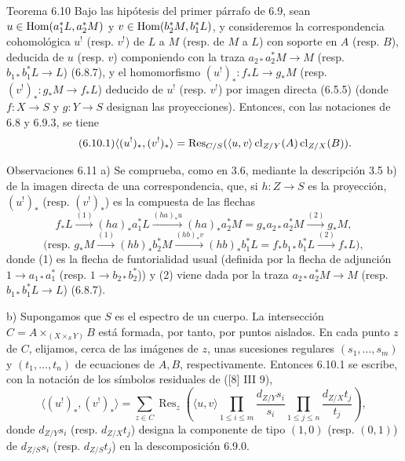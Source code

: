 \begin{statement}{Teorema 6.10}
Bajo las hipótesis del primer párrafo de 6.9, sean $u\in\operatorname{Hom}(a_1^*L,a_2^*M)$ y $v\in\operatorname{Hom}(b_2^*M,b_1^*L)$, y consideremos la correspondencia cohomológica $u^!$ (resp. $v^!$) de $L$ a $M$ (resp. de $M$ a $L$) con soporte en $A$ (resp. $B$), deducida de $u$ (resp. $v$) componiendo con la traza $a_{2*}a_2^*M\to M$ (resp. $b_{1*}b_1^*L\to L$) (6.8.7), y el homomorfismo $(u^!)_*:f_*L\to g_*M$ (resp. $(v^!)_*:g_*M\to f_*L$) deducido de $u^!$ (resp. $v^!$) por imagen directa (6.5.5) (donde $f:X\to S$ y $g:Y\to S$ designan las proyecciones). Entonces, con las notaciones de 6.8 y 6.9.3, se tiene
\begin{equation}
\tag{6.10.1}
\langle (u^!)_*,(v^!)_*\rangle=\operatorname{Res}_{C/S}(\langle u,v\rangle\operatorname{cl}_{Z/Y}(A)\operatorname{cl}_{Z/X}(B)).
\end{equation}
\end{statement}

\begin{statement}{Observaciones 6.11}
a) Se comprueba, como en 3.6, mediante la descripción 3.5 b) de la imagen directa de una correspondencia, que, si $h:Z\to S$ es la proyección, $(u^!)_*$ (resp. $(v^!)_*$) es la compuesta de las flechas
\[
f_*L\xrightarrow{(1)}(ha)_*a_1^*L\xrightarrow{(ha)_*u}(ha)_*a_2^*M=g_*a_{2*}a_2^*M\xrightarrow{(2)}g_*M,
\]
\[
\text{(resp. }g_*M\xrightarrow{(1)}(hb)_*b_2^*M\xrightarrow{(hb)_*v}(hb)_*b_1^*L=f_*b_{1*}b_1^*L\xrightarrow{(2)}f_*L\text{)},
\]
donde (1) es la flecha de funtorialidad usual (definida por la flecha de adjunción $1\to a_{1*}a_1^*$ (resp. $1\to b_{2*}b_2^*$)) y (2) viene dada por la traza $a_{2*}a_2^*M\to M$ (resp. $b_{1*}b_1^*L\to L$) (6.8.7).

b) Supongamos que $S$ es el espectro de un cuerpo. La intersección $C=A\times_{(X\times_S Y)}B$ está formada, por tanto, por puntos aislados. En cada punto $z$ de $C$, elijamos, cerca de las imágenes de $z$, unas sucesiones regulares $(s_1,\ldots,s_m)$ y $(t_1,\ldots,t_n)$ de ecuaciones de $A,B$, respectivamente. Entonces 6.10.1 se escribe, con la notación de los símbolos residuales de ([8] III 9),
\begin{equation}
\tag{6.11.1}
\langle (u^!)_*,(v^!)_*\rangle=
\sum_{z\in C}\operatorname{Res}_z\left(\langle u,v\rangle
\prod_{1\le i\le m}\frac{d_{Z/Y}s_i}{s_i}
\prod_{1\le j\le n}\frac{d_{Z/X}t_j}{t_j}\right),
\end{equation}
donde $d_{Z/Y}s_i$ (resp. $d_{Z/X}t_j$) designa la componente de tipo $(1,0)$ (resp. $(0,1)$) de $d_{Z/S}s_i$ (resp. $d_{Z/S}t_j$) en la descomposición 6.9.0.
\end{statement}

